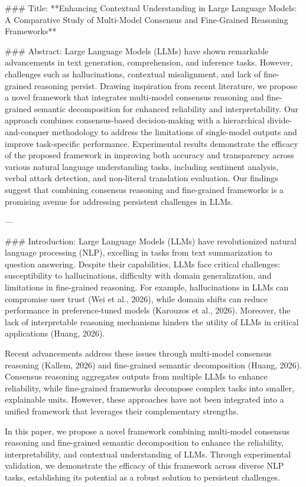 ### Title:
**Enhancing Contextual Understanding in Large Language Models: A Comparative Study of Multi-Model Consensus and Fine-Grained Reasoning Frameworks**

### Abstract:
Large Language Models (LLMs) have shown remarkable advancements in text generation, comprehension, and inference tasks. However, challenges such as hallucinations, contextual misalignment, and lack of fine-grained reasoning persist. Drawing inspiration from recent literature, we propose a novel framework that integrates multi-model consensus reasoning and fine-grained semantic decomposition for enhanced reliability and interpretability. Our approach combines consensus-based decision-making with a hierarchical divide-and-conquer methodology to address the limitations of single-model outputs and improve task-specific performance. Experimental results demonstrate the efficacy of the proposed framework in improving both accuracy and transparency across various natural language understanding tasks, including sentiment analysis, verbal attack detection, and non-literal translation evaluation. Our findings suggest that combining consensus reasoning and fine-grained frameworks is a promising avenue for addressing persistent challenges in LLMs.

---

### Introduction:
Large Language Models (LLMs) have revolutionized natural language processing (NLP), excelling in tasks from text summarization to question answering. Despite their capabilities, LLMs face critical challenges: susceptibility to hallucinations, difficulty with domain generalization, and limitations in fine-grained reasoning. For example, hallucinations in LLMs can compromise user trust (Wei et al., 2026), while domain shifts can reduce performance in preference-tuned models (Karouzos et al., 2026). Moreover, the lack of interpretable reasoning mechanisms hinders the utility of LLMs in critical applications (Huang, 2026).

Recent advancements address these issues through multi-model consensus reasoning (Kallem, 2026) and fine-grained semantic decomposition (Huang, 2026). Consensus reasoning aggregates outputs from multiple LLMs to enhance reliability, while fine-grained frameworks decompose complex tasks into smaller, explainable units. However, these approaches have not been integrated into a unified framework that leverages their complementary strengths.

In this paper, we propose a novel framework combining multi-model consensus reasoning and fine-grained semantic decomposition to enhance the reliability, interpretability, and contextual understanding of LLMs. Through experimental validation, we demonstrate the efficacy of this framework across diverse NLP tasks, establishing its potential as a robust solution to persistent challenges.


